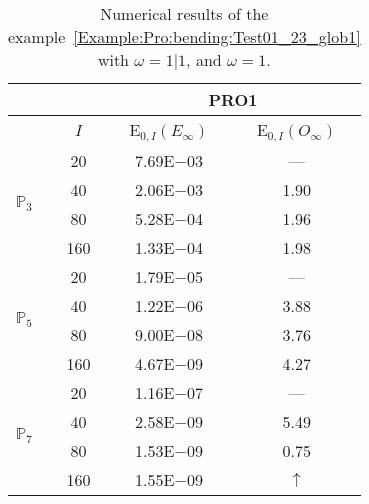 \begin{table}[H]
\caption{Numerical results of the example~\ref{Example:Pro:bending:Test01_23_glob1} with $\omega=1|1$, and $\omega=1$.}
\setlength{\tabcolsep}{5pt}
\centering
\begin{tabular}{@{}l c c c@{}}
\toprule
 &  & \multicolumn{2}{c}{PRO1}\\
\midrule
 & $I$ & E$_{0,I}(E_{\infty})$ & E$_{0,I}(O_{\infty})$\\
\midrule
\multirow{4}{*}{$\mathbb{P}_{3}$} & 20 & 7.69E$-$03 & ---\\
 & 40 & 2.06E$-$03 & 1.90\\
 & 80 & 5.28E$-$04 & 1.96\\
 & 160 & 1.33E$-$04 & 1.98\\
\midrule
\multirow{4}{*}{$\mathbb{P}_{5}$} & 20 & 1.79E$-$05 & ---\\
 & 40 & 1.22E$-$06 & 3.88\\
 & 80 & 9.00E$-$08 & 3.76\\
 & 160 & 4.67E$-$09 & 4.27\\
\midrule
\multirow{4}{*}{$\mathbb{P}_{7}$} & 20 & 1.16E$-$07 & ---\\
 & 40 & 2.58E$-$09 & 5.49\\
 & 80 & 1.53E$-$09 & 0.75\\
 & 160 & 1.55E$-$09 & $\uparrow$\\
\bottomrule
\end{tabular}
\label{Table:PRO:test_01_23_test17}
\end{table}
